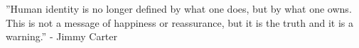 ''Human identity is no longer defined by what one does, but by what one owns. This is not a message of happiness or reassurance, but it is the truth and it is a warning.'' - Jimmy Carter
